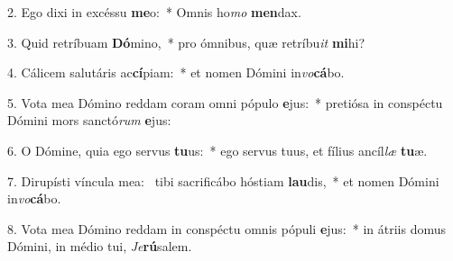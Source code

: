 2. Ego dixi in excéssu \textbf{me}o:~*  Omnis ho\textit{mo} \textbf{men}dax.\

3. Quid retríbuam \textbf{Dó}mino,~*  pro ómnibus, quæ retríbu\textit{it} \textbf{mi}hi?\

4. Cálicem salutáris ac\textbf{cí}piam:~*  et nomen Dómini in\textit{vo}\textbf{cá}bo.\

5. Vota mea Dómino reddam coram omni pópulo \textbf{e}jus:~*  pretiósa in conspéctu Dómini mors sanctó\textit{rum} \textbf{e}jus:\

6. O Dómine, quia ego servus \textbf{tu}us:~*  ego servus tuus, et fílius ancíl\textit{læ} \textbf{tu}æ.\

7. Dirupísti víncula mea: \dag\  tibi sacrificábo hóstiam \textbf{lau}dis,~*  et nomen Dómini in\textit{vo}\textbf{cá}bo.\

8. Vota mea Dómino reddam in conspéctu omnis pópuli \textbf{e}jus:~*  in átriis domus Dómini, in médio tui, \textit{Je}\textbf{rú}salem.\

